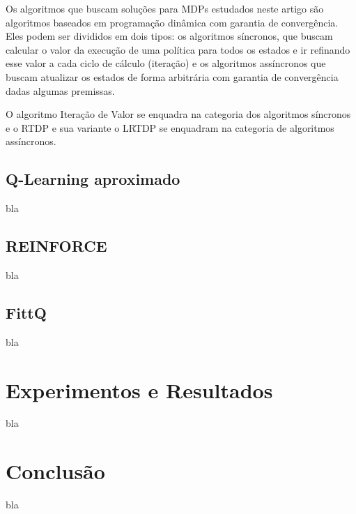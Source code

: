 \documentclass[letterpaper]{article}
\begin{document}
Os algoritmos que buscam soluções para MDPs estudados neste artigo são algoritmos baseados em programação dinâmica com garantia de convergência. Eles podem ser divididos em dois tipos: os algoritmos síncronos, que buscam calcular o valor da execução de uma política para todos os estados e ir refinando esse valor a cada ciclo de cálculo (iteração) e os algoritmos assíncronos que buscam atualizar os estados de forma arbitrária com garantia de convergência dadas algumas premissas.

O algoritmo Iteração de Valor \cite{Howard-1960} se enquadra na categoria dos algoritmos síncronos e o RTDP \cite{BartoBradtkeSingh-1995} e sua variante o LRTDP \cite{BonetGeffer-2003} se enquadram na categoria de algoritmos assíncronos.

\subsection{Q-Learning aproximado}
bla

\subsection{REINFORCE}
bla

\subsection{FittQ}
bla






\section{Experimentos e Resultados}

bla

\section{Conclusão}

bla



\end{document}

